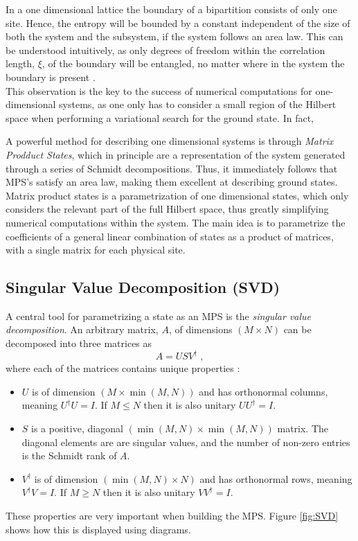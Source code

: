 In a one dimensional lattice the boundary of a bipartition consists of only one site. Hence, the entropy will be bounded by a constant independent of the size of both the system and the subsystem, if the system follows an area law. This can be understood intuitively, as only degrees of freedom within the correlation length, $\xi$, of the boundary will be entangled, no matter where in the system the boundary is present \cite{Hastings2007}.\\
This observation is the key to the success of numerical computations for one-dimensional systems, as one only has to consider a small region of the Hilbert space when performing a variational search for the ground state. In fact, 



A powerful method for describing one dimensional systems is through \textit{Matrix Prodduct States}, which in principle are a representation of the system generated through a series of Schmidt decompositions. Thus, it immediately follows that MPS's satisfy an area law, making them excellent at describing ground states.\\ 


Matrix product states is a parametrization of one dimensional states, which only considers the relevant part of the full Hilbert space, thus greatly simplifying numerical computations within the system. The main idea is to parametrize the coefficients of a general linear combination of states as a product of matrices, with a single matrix for each physical site.\\


\subsection{Singular Value Decomposition (SVD)}
A central tool for parametrizing a state as an MPS is the \textit{singular value decomposition}. An arbitrary matrix, $A$, of dimensions $(M \times N)$ can be decomposed into three matrices as
\begin{equation}
	A = U S V^{\dag} \; ,
\end{equation}
where each of the matrices contains unique properties \cite{Schollwock}:
\begin{itemize}
	\item
		$U$ is of dimension $(M \times \min(M,N))$ and has orthonormal columns, meaning 			$U^{\dag}U = I$. If $M \leq N$ then it is also unitary $U U^{\dag} = I$.
	\item
		$S$ is a positive, diagonal $(\min(M,N) \times \min(M,N))$ matrix. The diagonal 			elements are are singular values, and the number of non-zero entries is the 				Schmidt rank of $A$.
	\item
		 $V^{\dag}$ is of dimension $(\min(M,N) \times N)$ and has orthonormal rows, meaning $V^{\dag}V = I$. If $M \geq N$ then it is also unitary $V V^{\dag} = I$.
\end{itemize}
These properties are very important when building the MPS. Figure \ref{fig:SVD} shows how this is displayed using diagrams.

